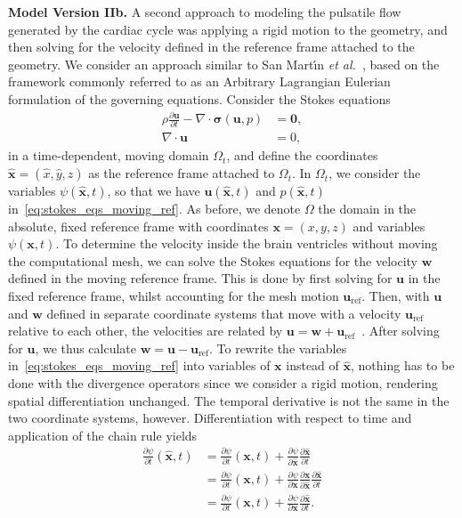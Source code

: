 \documentclass[fleqn]{wlscirep}
\newcommand{\pdifft}[1]{\frac{\partial  #1}{\partial t}}
\newcommand{\uu}{\mathbf{u}}
\newcommand{\uuref}{\mathbf{u}_{\mathrm{ref}}}
\newcommand{\ww}{\mathbf{w}}
\newcommand{\xx}{\bm{x}}
\begin{document}
\iffalse
\textbf{Model Version IIb.} A second approach to modeling the pulsatile flow generated by the cardiac cycle was applying a rigid motion to the geometry, and then solving for the velocity defined in the reference frame attached to the geometry. We consider an approach similar to San Mart{\'\i}n \emph{et al.}~\cite{san2009convergence}, based on the framework commonly referred to as an Arbitrary Lagrangian Eulerian formulation of the governing equations. Consider the Stokes equations 
\begin{subequations}
    \begin{alignat}{2}
        \rho\pdifft{\uu} - \nabla\cdot\bm{\sigma}(\uu, p) &= \mathbf{0}, \\
        \nabla\cdot\uu &= 0,
    \end{alignat}
    \label{eq:stokes_eqs_moving_ref}%
\end{subequations}%
in a time-dependent, moving domain $\Omega_t$, and define the coordinates $\hat{\xx} = (\hat{x}, \hat{y}, \hat{z})$ as the reference frame attached to $\Omega_t$. In $\Omega_t$, we consider the variables $\psi(\hat{\xx}, t)$, so that we have $\uu(\hat{\xx}, t)$ and $p(\hat{\xx}, t)$ in~\eqref{eq:stokes_eqs_moving_ref}. As before, we denote $\Omega$ the domain in the absolute, fixed reference frame with coordinates $\xx = (x, y, z)$ and variables $\psi(\xx, t)$. To determine the velocity inside the brain ventricles without moving the computational mesh, we can solve the Stokes equations for the velocity $\ww$ defined in the moving reference frame. This is done by first solving for $\uu$ in the fixed reference frame, whilst accounting for the mesh motion $\uuref$. Then, with $\uu$ and $\ww$ defined in separate coordinate systems that move with a velocity $\uuref$ relative to each other, the velocities are related by $\uu = \ww + \uuref$~\cite{meriam2012engineering}. After solving for $\uu$, we thus calculate $\ww = \uu - \uuref$.  To rewrite the variables in~\eqref{eq:stokes_eqs_moving_ref} into variables of $\xx$ instead of $\hat{\xx}$, nothing has to be done with the divergence operators since we consider a rigid motion, rendering spatial differentiation unchanged. The temporal derivative is not the same in the two coordinate systems, however. Differentiation with respect to time and application of the chain rule yields
\begin{equation*}
    \begin{aligned}
        \pdifft{\psi}(\hat{\xx}, t) &= \pdifft{\psi}(\xx, t) + \frac{\partial \psi}{\partial\hat{\xx}}\pdifft{\hat{\xx}} \\
        &= \pdifft{\psi}(\xx, t) + \frac{\partial \psi}{\partial\xx}\frac{\partial\xx}{\partial\hat{\xx}}\pdifft{\hat{\xx}} \\
        &= \pdifft{\psi}(\xx, t) + \frac{\partial \psi}{\partial\xx}\pdifft{\hat{\xx}}.
    \end{aligned}
\end{equation*}
\end{document}
